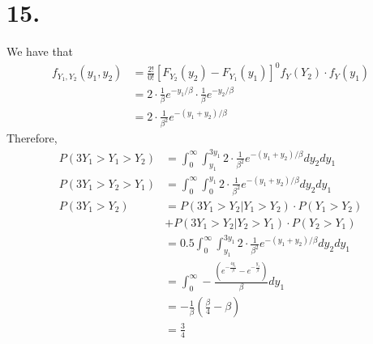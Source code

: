 \documentclass[11pt]{article}
\begin{document}
\section*{15.}
We have that 
\begin{equation*}
    \begin{aligned}
        f_{Y_1, Y_2}(y_1, y_2) &= \frac{2!}{0!} [F_{Y_2}(y_2) - F_{Y_1}(y_1)]^0 f_Y(Y_2) \cdot f_Y(y_1) \\
        &= 2 \cdot \frac{1}{\beta}e^{-y_1/\beta} \cdot \frac{1}{\beta}e^{-y_2/\beta}  \\
        &= 2 \cdot \frac{1}{\beta^2}e^{-(y_1+y_2)/\beta}
    \end{aligned}
\end{equation*}
Therefore, 
\begin{equation*}
    \begin{aligned}
        P(3Y_1 > Y_1 > Y_2) 
        &= \int_0^\infty \int_{y_1}^{3y_1} 2 \cdot \frac{1}{\beta^2}e^{-(y_1+y_2)/\beta} dy_2 dy_1 \\
        P(3Y_1 > Y_2>Y_1) 
        &= \int_0^\infty \int_{0}^{y_1} 2 \cdot \frac{1}{\beta^2}e^{-(y_1+y_2)/\beta} dy_2 dy_1 \\
        P(3Y_1 > Y_2) 
        &= P(3Y_1 > Y_2 | Y_1>Y_2) \cdot P(Y_1>Y_2) \\
        &+ P(3Y_1>Y_2|Y_2>Y_1)\cdot P(Y_2>Y_1) \\
        &= 0.5 \int_0^\infty \int_{y_1}^{3y_1} 2 \cdot \frac{1}{\beta^2}e^{-(y_1+y_2)/\beta} dy_2 dy_1 \\
        &= \int_0^\infty -\frac{\left(e^{-\frac{4y_1}{\beta}}-e^{-\frac{y_1}{\beta}}\right)}{\beta} dy_1 \\
        &= -\frac{1}{\beta}\left(\frac{\beta}{4}-\beta\right) \\
        &= \frac{3}{4}
    \end{aligned}
\end{equation*}
\end{document}
